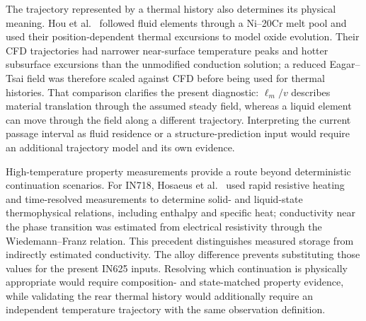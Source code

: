 The trajectory represented by a thermal history also determines its physical meaning. Hou et al.~\cite{Hou2024Dissolution} followed fluid elements through a Ni--20Cr melt pool and used their position-dependent thermal excursions to model oxide evolution. Their CFD trajectories had narrower near-surface temperature peaks and hotter subsurface excursions than the unmodified conduction solution; a reduced Eagar--Tsai field was therefore scaled against CFD before being used for thermal histories. That comparison clarifies the present diagnostic: $\ell_m/v$ describes material translation through the assumed steady field, whereas a liquid element can move through the field along a different trajectory. Interpreting the current passage interval as fluid residence or a structure-prediction input would require an additional trajectory model and its own evidence.

High-temperature property measurements provide a route beyond deterministic continuation scenarios. For IN718, Hosaeus et al.~\cite{pottlacher2001} used rapid resistive heating and time-resolved measurements to determine solid- and liquid-state thermophysical relations, including enthalpy and specific heat; conductivity near the phase transition was estimated from electrical resistivity through the Wiedemann--Franz relation. This precedent distinguishes measured storage from indirectly estimated conductivity. The alloy difference prevents substituting those values for the present IN625 inputs. Resolving which continuation is physically appropriate would require composition- and state-matched property evidence, while validating the rear thermal history would additionally require an independent temperature trajectory with the same observation definition.
